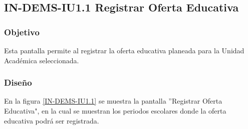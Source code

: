 \subsection{IN-DEMS-IU1.1 Registrar Oferta Educativa}

\subsubsection{Objetivo}

Esta pantalla permite al  registrar la oferta educativa planeada para la Unidad Académica seleccionada.

\subsubsection{Diseño}

En la figura \ref{IN-DEMS-IU1.1} se muestra la pantalla ''Registrar Oferta Educativa", en la cual se muestran los periodos escolares donde la oferta educativa podrá ser registrada.

